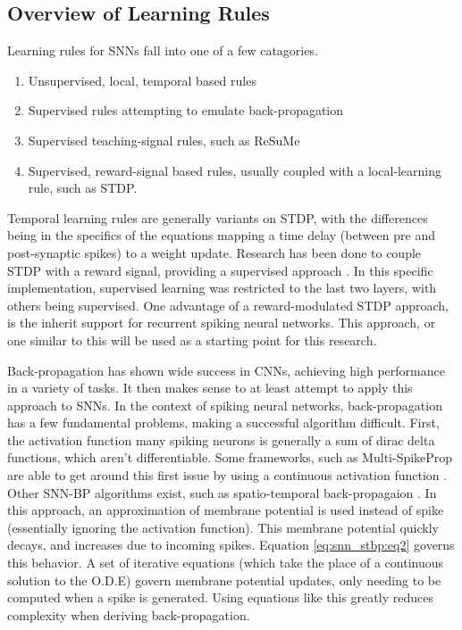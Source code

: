     \subsection{Overview of Learning Rules}
    Learning rules for SNNs fall into one of a few catagories.
    \begin{enumerate}
        \item Unsupervised, local, temporal based rules
        \item Supervised rules attempting to emulate back-propagation
        \item Supervised teaching-signal rules, such as ReSuMe
        \item Supervised, reward-signal based rules, usually coupled with a local-learning rule, such as STDP.
    \end{enumerate}
    
    Temporal learning rules are generally variants on STDP, with the differences being in the specifics of the equations mapping a time delay (between pre and post-synaptic spikes) to a weight update. Research has been done to couple STDP with a reward signal, providing a supervised approach \cite{rstdp_mnist}. In this specific implementation, supervised learning was restricted to the last two layers, with others being supervised. One advantage of a reward-modulated STDP approach, is the inherit support for recurrent spiking neural networks. This approach, or one similar to this will be used as a starting point for this research.
    
    Back-propagation has shown wide success in CNNs, achieving high performance in a variety of tasks. It then makes sense to at least attempt to apply this approach to SNNs. In the context of spiking neural networks, back-propagation has a few fundamental problems, making a successful algorithm difficult. First, the activation function many spiking neurons is generally a sum of dirac delta functions, which aren't differentiable. Some frameworks, such as Multi-SpikeProp are able to get around this first issue by using a continuous activation function \cite{deep_spike}. Other SNN-BP algorithms exist, such as spatio-temporal back-propagaion \cite{snn_stbp}. In this approach, an approximation of membrane potential is used instead of spike (essentially ignoring the activation function). This membrane potential quickly decays, and increases due to incoming spikes. Equation \ref{eq:snn_stbp:eq2} governs this behavior. A set of iterative equations (which take the place of a continuous solution to the O.D.E) govern membrane potential updates, only needing to be computed when a spike is generated. Using equations like this greatly reduces complexity when deriving back-propagation.
    
